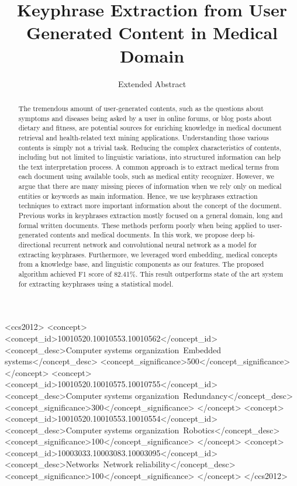 \documentclass[sigconf]{acmart}
\begin{document}
\title{Keyphrase Extraction from User Generated Content in Medical Domain}
\subtitle{Extended Abstract}



\renewcommand{\shortauthors}{F. Ilham et al.}


\begin{abstract}
The tremendous amount of user-generated contents, such as the questions about symptoms and diseases being asked by a user in online forums, or blog posts about dietary and fitness, are potential sources for enriching knowledge in medical document retrieval and health-related text mining applications. Understanding those various contents is simply not a trivial task. Reducing the complex characteristics of contents, including but not limited to linguistic variations, into structured information can help the text interpretation process. A common approach is to extract medical terms from each document using available tools, such as medical entity recognizer. However, we argue that there are many missing pieces of information when we rely only on medical entities or keywords as main information. Hence, we use keyphrases extraction techniques to extract more important information about the concept of the document. Previous works in keyphrases extraction mostly focused on a general domain, long and formal written documents. These methods perform poorly when being applied to user-generated contents and medical documents. In this work, we propose deep bi-directional recurrent network and convolutional neural network as a model for extracting keyphrases. Furthermore, we leveraged word embedding, medical concepts from a knowledge base, and linguistic components as our features. The proposed algorithm achieved F1 score of 82.41\%. This result outperforms state of the art system for extracting keyphrases using a statistical model.
\end{abstract}

%
%
\begin{CCSXML}
<ccs2012>
 <concept>
  <concept_id>10010520.10010553.10010562</concept_id>
  <concept_desc>Computer systems organization~Embedded systems</concept_desc>
  <concept_significance>500</concept_significance>
 </concept>
 <concept>
  <concept_id>10010520.10010575.10010755</concept_id>
  <concept_desc>Computer systems organization~Redundancy</concept_desc>
  <concept_significance>300</concept_significance>
 </concept>
 <concept>
  <concept_id>10010520.10010553.10010554</concept_id>
  <concept_desc>Computer systems organization~Robotics</concept_desc>
  <concept_significance>100</concept_significance>
 </concept>
 <concept>
  <concept_id>10003033.10003083.10003095</concept_id>
  <concept_desc>Networks~Network reliability</concept_desc>
  <concept_significance>100</concept_significance>
 </concept>
</ccs2012>  
\end{CCSXML}
\end{document}
